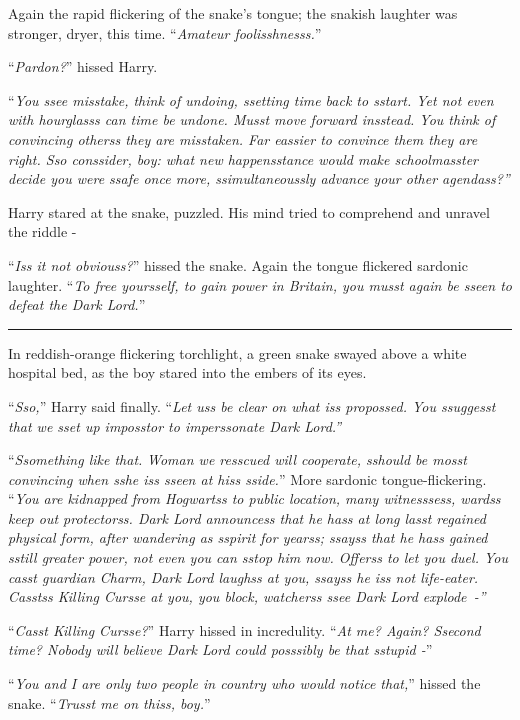 Again the rapid flickering of the snake's tongue; the snakish laughter was stronger, dryer, this time. ``\emph{Amateur foolisshnesss.}''

``\emph{Pardon?}'' hissed Harry.

``\emph{You ssee misstake, think of undoing, ssetting time back to sstart. Yet not even with hourglasss can time be undone. Musst move forward insstead. You think of convincing otherss they are misstaken. Far eassier to convince them they are right. Sso conssider, boy: what new happensstance would make schoolmasster decide you were ssafe once more, ssimultaneoussly advance your other agendass?''}

Harry stared at the snake, puzzled. His mind tried to comprehend and unravel the riddle -

``\emph{Iss it not obviouss?}'' hissed the snake. Again the tongue flickered sardonic laughter. ``\emph{To free yoursself, to gain power in Britain, you musst again be sseen to defeat the Dark Lord.}''

\begin{center}\rule{3in}{0.4pt}\end{center}

In reddish-orange flickering torchlight, a green snake swayed above a white hospital bed, as the boy stared into the embers of its eyes.

``\emph{Sso,}'' Harry said finally. ``\emph{Let uss be clear on what iss propossed. You ssuggesst that we sset up imposstor to imperssonate Dark Lord.''}

``\emph{Ssomething like that.} \emph{Woman we resscued will cooperate, sshould be mosst convincing when sshe iss sseen at hiss sside.}'' More sardonic tongue-flickering. ``\emph{You are kidnapped from Hogwartss to public location, many witnesssess, wardss keep out protectorss. Dark Lord announcess that he hass at long lasst regained physical form, after wandering as sspirit for yearss; ssayss that he hass gained sstill greater power, not even you can sstop him now. Offerss to let you duel. You casst guardian Charm, Dark Lord laughss at you, ssayss he iss not life-eater. Casstss Killing Cursse at you, you block, watcherss ssee Dark Lord explode~-''}

``\emph{Casst Killing Cursse?}'' Harry hissed in incredulity. ``\emph{At me? Again? Ssecond time? Nobody will believe Dark Lord could posssibly be that sstupid -}''

``\emph{You and I are only two people in country who would notice that,}'' hissed the snake. ``\emph{Trusst me on thiss, boy.}''

